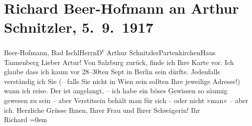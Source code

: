 

         
         \renewcommand{\erwaehntePersonen}{Personen: Richard Beer-Hofmann, Olga Schnitzler, Elisabeth Steinrück}
         \renewcommand{\erwaehnteOrte}{Orte: Bad Ischl, Berlin, Garmisch-Partenkirchen, Haus Tannenberg, Partenkirchen, Salzburg, Wien}
         \renewcommand{\erwaehnteWerke}{}
               \section[Richard Beer-Hofmann an Arthur Schnitzler, 5. 9. 1917]{ Richard Beer-Hofmann an Arthur Schnitzler, 5. 9. 1917}\nopagebreak{}\rehead{ }\begin{ledgroupsized}[t]{13cm}\normalsize\beginnumbering{} \toendnotes[C]{\smallbreak\pagebreak[2]} 
\toendnotes[C]{\smallbreak}\pstart{}{\pb}Beer-Hofmann, Bad Ischl\pend{}{\bigskip}\pstart{}Herrn\pend{}\pstart{}D\textsuperscript{r} Arthur Schnitzler\pend{}\pstart{}Partenkirchen\pend{}\pstart{}Haus Tannenberg\pend{}{\bigskip}\pstart
           \noindent{}{\pb}Lieber Artur! Von Salzburg
               zurück, finde ich Ihre Karte vor. Ich glaube dass ich kaum vor
                  28–30ten Sept in Berlin sein dürfte. Jedenfalls verständig ich Sie (– falls Sie nicht in Wien sein sollten Ihre jeweilige Adresse!) wann ich
               reise.\pend
           \pstart
           Der \label{K_L02273-1v}\label{K_L02273-1h} ist angelangt, – ich habe ein böses Gewissen so säumig {\pb}gewesen zu sein – aber Versti{\geminationm}tsein behält man für sich – oder nicht »man« – aber
               ich.\pend
           \pstart
           Herzliche Grüsse Ihnen, Ihrer Frau und Ihrer Schwägerin! Ihr{\\[\baselineskip]}\spacefill\mbox{Richard}\pend
           \leftskip=0em{}
         
         \endnumbering{}\end{ledgroupsized}  \newcommand{\dateiname}{L02273}\newcommand{\titel}{Richard Beer-Hofmann an Arthur Schnitzler, 5. 9. 1917}\newcommand{\editorInnen}{Martin Anton Müller und Gerd-Hermann Susen}
      